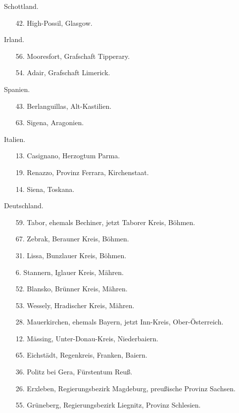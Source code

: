 \documentclass[a4paper, 11pt, oneside, polutonikogreek, german]{article}
\begin{document}
\begin{center}
Schottland.
\end{center}
\begin{itemize}
    \small
    \item[42.] High-Possil, Glasgow.
\end{itemize}
\begin{center}
Irland.
\end{center}
\begin{itemize}
    \small
    \item[56.] Mooresfort, Grafschaft Tipperary.
    \item[54.] Adair, Grafschaft Limerick.
\end{itemize}
\begin{center}
Spanien.
\end{center}
\begin{itemize}
    \small
    \item[43.] Berlanguillas, Alt-Kastilien.
    \item[63.] Sigena, Aragonien.
\end{itemize}
\begin{center}
Italien.
\end{center}
\begin{itemize}
    \small
    \item[13.] Casignano, Herzogtum Parma.
    \item[19.] Renazzo, Provinz Ferrara, Kirchenstaat.
    \item[14.] Siena, Toskana.
\end{itemize}
\begin{center}
Deutschland.
\end{center}
\begin{itemize}
    \small
    \item[59.] Tabor, ehemals Bechiner, jetzt Taborer Kreis, Böhmen.
    \item[67.] Zebrak, Berauner Kreis, Böhmen.
    \item[31.] Lissa, Bunzlauer Kreis, Böhmen.
    \item[6.] Stannern, Iglauer Kreis, Mähren.
    \item[52.] Blansko, Brünner Kreis, Mähren.
    \item[53.] Wessely, Hradischer Kreis, Mähren.
    \item[28.] Mauerkirchen, ehemals Bayern, jetzt Inn-Kreis, Ober-Österreich.
    \item[12.] Mässing, Unter-Donau-Kreis, Niederbaiern.
    \item[65.] Eichstädt, Regenkreis, Franken, Baiern.
    \item[36.] Politz bei Gera, Fürstentum Reuß.
    \item[26.] Erxleben, Regierungsbezirk Magdeburg, preußische Provinz Sachsen.
    \item[55.] Grüneberg, Regierungsbezirk Liegnitz, Provinz Schlesien.
\end{itemize}
\end{document}
